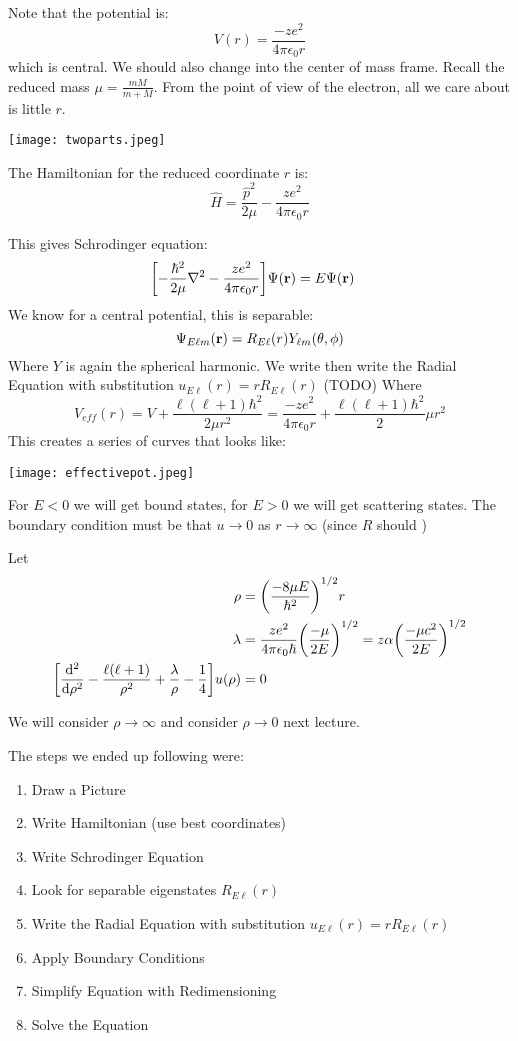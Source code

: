 Note that the potential is:
\[ V(r) = \frac{-ze^2}{4 \pi \epsilon_0 r} \]
which is central. We should also change into the center of mass frame.
Recall the reduced mass $\mu = \frac{mM}{m + M}$. From the point of view of the electron, all we care about is little $r$.

\texttt{[image: twoparts.jpeg]}

The Hamiltonian for the reduced coordinate $r$ is:
\[ \hat{H} = \frac{\hat{p}^2}{2\mu} - \frac{ze^2}{4\pi\epsilon_0 r} \]

This gives Schrodinger equation:
\begin{align*}
    \qty[-\frac{\hbar^2}{2\mu}\nabla^2 - \frac{ze^2}{4\pi\epsilon_0 r}] \Psi(\mathbf{r}) &= E \Psi(\mathbf{r})
\end{align*}
We know for a central potential, this is separable:
\[ \Psi_{E\ell m}(\mathbf{r}) = R_{E \ell}(r) Y_{\ell m}(\theta, \phi) \]
Where $Y$ is again the spherical harmonic. We write then write the Radial Equation with substitution $u_{E\ell}(r) = r R_{E\ell}(r)$
(TODO)
Where 
\[ V_{eff}(r) = V + \frac{\ell(\ell + 1)\hbar^2}{2\mu r^2} = \frac{-ze^2}{4\pi\epsilon_0 r} + \frac{\ell(\ell + 1)\hbar^2} 2\mu r^2\]
This creates a series of curves that looks like:

\texttt{[image: effectivepot.jpeg]}

For $E < 0$ we will get bound states, for $E > 0$ we will get scattering states.
The boundary condition must be that $u \to 0$ as $r \to \infty$ (since $R$ should )

Let
\begin{align*}
    \rho &= \qty(\frac{-8\mu E}{\hbar^2})^{1/2} r \\
    \lambda &= \frac{ze^2}{4\pi\epsilon_0 \hbar} \qty(\frac{-\mu}{2E})^{1/2} = z \alpha \qty(\frac{-\mu c^2}{2E})^{1/2} \\
    \qty[\dv{^2}{\rho^2} - \frac{\ell(\ell + 1)}{\rho^2} + \frac{\lambda}{\rho} - \frac{1}{4}] u(\rho) &= 0
\end{align*}

We will consider $\rho \to \infty$ and consider $\rho \to 0$ next lecture.

The steps we ended up following were:
\begin{enumerate}
    \item Draw a Picture
    \item Write Hamiltonian (use best coordinates)
    \item Write Schrodinger Equation
    \item Look for separable eigenstates $R_{E\ell}(r)$
    \item Write the Radial Equation with substitution $u_{E\ell}(r) = r R_{E\ell}(r)$
    \item Apply Boundary Conditions
    \item Simplify Equation with Redimensioning
    \item Solve the Equation
\end{enumerate}